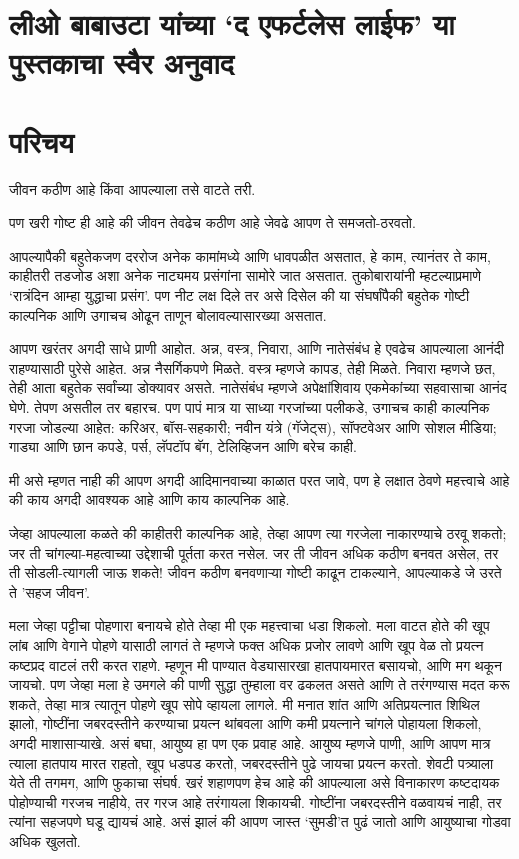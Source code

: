 \chapter*{लीओ बाबाउटा यांच्या `द एफर्टलेस लाईफ' या पुस्तकाचा स्वैर अनुवाद}

\chapter{परिचय}

जीवन कठीण आहे किंवा आपल्याला तसे वाटते तरी. 

पण खरी गोष्ट ही आहे की जीवन तेवढेच कठीण आहे जेवढे आपण ते समजतो-ठरवतो.

आपल्यापैकी बहुतेकजण दररोज अनेक कामांमध्ये आणि धावपळीत असतात, हे काम, त्यानंतर ते काम, काहीतरी  तडजोड अशा अनेक नाट्यमय प्रसंगांना सामोरे जात असतात. तुकोबारायांनी म्हटल्याप्रमाणे ‘रात्रंदिन आम्हा युद्धाचा प्रसंग’. पण नीट लक्ष दिले तर असे दिसेल की या संघर्षांपैकी बहुतेक गोष्टी काल्पनिक आणि उगाचच ओढून ताणून बोलावल्यासारख्या असतात.

आपण खरंतर अगदी साधे प्राणी आहोत. अन्न, वस्त्र, निवारा, आणि नातेसंबंध हे एवढेच आपल्याला आनंदी राहण्यासाठी पुरेसे आहेत. अन्न  नैसर्गिकपणे मिळते. वस्त्र म्हणजे कापड, तेही मिळते. निवारा म्हणजे छत, तेही आता बहुतेक सर्वांच्या डोक्यावर असते. नातेसंबंध म्हणजे अपेक्षांशिवाय एकमेकांच्या सहवासाचा आनंद घेणे. तेपण असतील तर बहारच. पण पापं मात्र या साध्या गरजांच्या पलीकडे, उगाचच काही काल्पनिक गरजा जोडल्या आहेत: करिअर, बॉस-सहकारी; नवीन यंत्रे (गॅजेट्स), सॉफ्टवेअर आणि सोशल मीडिया; गाड्या आणि छान कपडे, पर्स, लॅपटॉप बॅग, टेलिव्हिजन आणि बरेच काही. 

मी असे म्हणत नाही की आपण अगदी आदिमानवाच्या काळात परत जावे, पण हे लक्षात ठेवणे महत्त्वाचे आहे की काय अगदी आवश्यक आहे आणि काय काल्पनिक आहे.

जेव्हा आपल्याला कळते की काहीतरी काल्पनिक आहे, तेव्हा आपण त्या गरजेला नाकारण्याचे ठरवू शकतो; जर ती चांगल्या-महत्वाच्या  उद्देशाची पूर्तता करत नसेल. जर ती जीवन अधिक कठीण बनवत असेल, तर ती सोडली-त्यागली जाऊ शकते! जीवन कठीण बनवणाऱ्या गोष्टी काढून टाकल्याने, आपल्याकडे जे उरते ते 'सहज जीवन'.

मला जेव्हा पट्टीचा पोहणारा बनायचे होते तेव्हा मी एक महत्त्वाचा धडा शिकलो.  मला वाटत होते की खूप लांब आणि वेगाने पोहणे यासाठी लागतं ते म्हणजे फक्त अधिक प्रजोर लावणे आणि खूप वेळ तो प्रयत्न कष्टप्रद वाटलं तरी करत राहणे. म्हणून मी पाण्यात वेड्यासारखा हातपायमारत बसायचो, आणि मग थकून जायचो. पण जेव्हा मला हे उमगले की पाणी सुद्धा  तुम्हाला वर ढकलत असते आणि ते तरंगण्यास मदत करू शकते, तेव्हा मात्र त्यातून पोहणे खूप सोपे व्हायला लागले. मी मनात शांत आणि अतिप्रयत्नात शिथिल झालो, गोष्टींना जबरदस्तीने करण्याचा प्रयत्न थांबवला आणि कमी प्रयत्नाने चांगले पोहायला शिकलो, अगदी माशासाऱ्याखे. 
असं बघा, आयुष्य हा पण एक प्रवाह आहे. आयुष्य म्हणजे पाणी, आणि आपण मात्र त्याला हातपाय मारत राहतो, खूप धडपड करतो, जबरदस्तीने पुढे जायचा प्रयत्न करतो. शेवटी पत्र्याला येते ती तगमग, आणि फुकाचा संघर्ष. खरं शहाणपण हेच आहे की आपल्याला असे विनाकारण कष्टदायक पोहोण्याची गरजच नाहीये, तर गरज आहे तरंगायला शिकायची. गोष्टींना जबरदस्तीने वळवायचं नाही, तर त्यांना सहजपणे घडू द्यायचं आहे. असं झालं की आपण जास्त ‘सुमडी’त पुढं जातो आणि आयुष्याचा गोडवा अधिक खुलतो.


